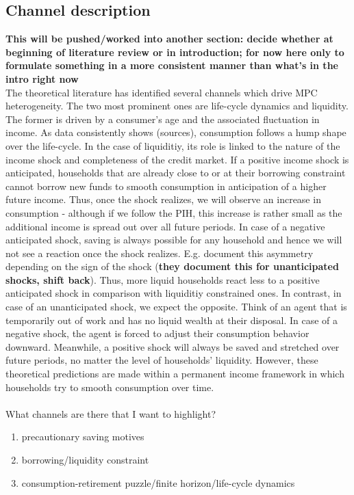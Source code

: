\subsection{Channel description}
\textbf{This will be pushed/worked into another section: decide whether at beginning of literature review or in introduction; for now here only to formulate something in a more consistent manner than what's in the intro right now} \\
The theoretical literature has identified several channels which drive MPC heterogeneity. The two most prominent ones are life-cycle dynamics and liquidity. The former is driven by a consumer's age and the associated fluctuation in income. As data consistently shows (sources), consumption follows a hump shape over the life-cycle. In the case of liquiditiy, its role is linked to the nature of the income shock and completeness of the credit market. If a positive income shock is anticipated, households that are already close to or at their borrowing constraint cannot borrow new funds to smooth consumption in anticipation of a higher future income. Thus, once the shock realizes, we will observe an increase in consumption - although if we follow the PIH, this increase is rather small as the additional income is spread out over all future periods. In case of a negative anticipated shock, saving is always possible for any household and hence we will not see a reaction once the shock realizes. E.g. \cite{bunn_etal} document this asymmetry depending on the sign of the shock (\textbf{they document this for unanticipated shocks, shift back}). Thus, more liquid households react less to a positive anticipated shock in comparison with liquiditiy constrained ones. In contrast, in case of an unanticipated shock, we expect the opposite. Think of an agent that is temporarily out of work and has no liquid wealth at their disposal. In case of a negative shock, the agent is forced to adjust their consumption behavior downward. Meanwhile, a positive shock will always be saved and stretched over future periods, no matter the level of households' liquidity. However, these theoretical predictions are made within a permanent income framework in which households try to smooth consumption over time.\\ 
\\
What channels are there that I want to highlight? 
\begin{enumerate}
    \item precautionary saving motives
    \item borrowing/liquidity constraint
    \item consumption-retirement puzzle/finite horizon/life-cycle dynamics
\end{enumerate}
